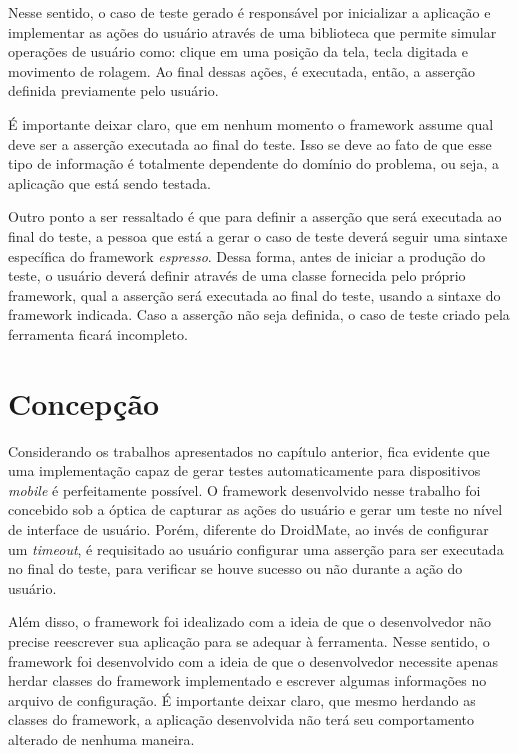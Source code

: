 \documentclass[
    12pt,       %
    openright,      %
    twoside,      %
    a4paper,      %
    english,      %
    french,       %
    spanish,      %
    brazil,       %
    ]{abntex2}
\begin{document}
        Nesse sentido, o caso de teste gerado é responsável por inicializar a aplicação e implementar as
        ações do usuário através de uma biblioteca que permite simular operações de usuário como: clique
        em uma posição da tela, tecla digitada e movimento de rolagem. Ao final dessas ações, é executada,
        então, a asserção definida previamente pelo usuário.

        É importante deixar claro, que em nenhum momento o framework assume qual deve ser a asserção
        executada ao final do teste. Isso se deve ao fato de que esse tipo de informação é totalmente
        dependente do domínio do problema, ou seja, a aplicação que está sendo testada.

        Outro ponto a ser ressaltado é que para definir a asserção que será executada ao final do teste,
        a pessoa que está a gerar o caso de teste deverá seguir uma sintaxe específica do framework
        \textit{espresso}. Dessa forma, antes de iniciar a produção do teste, o usuário
        deverá definir através de uma classe fornecida pelo próprio framework, qual a asserção será
        executada ao final do teste, usando a sintaxe do framework indicada. Caso a asserção não seja
        definida, o caso de teste criado pela ferramenta ficará incompleto.

      \section{Concepção}
        Considerando os trabalhos apresentados no capítulo anterior, fica evidente que uma implementação
        capaz de gerar testes automaticamente para dispositivos \textit{mobile} é perfeitamente possível. O
        framework desenvolvido nesse trabalho foi concebido sob a óptica de capturar as ações do
        usuário e gerar um teste no nível de interface de usuário. Porém, diferente do DroidMate, ao invés
        de configurar um \textit{timeout}, é requisitado ao usuário configurar uma asserção
        para ser executada no final do teste, para verificar se houve sucesso ou não durante a ação
        do usuário.

        Além disso, o framework foi idealizado com a ideia de que o desenvolvedor não precise
        reescrever sua aplicação para se adequar à ferramenta. Nesse sentido, o framework
        foi desenvolvido com a ideia de que o desenvolvedor necessite apenas herdar classes
        do framework implementado e escrever algumas informações no arquivo de configuração.
        É importante deixar claro, que mesmo herdando as classes do framework, a aplicação
        desenvolvida não terá seu comportamento alterado de nenhuma maneira.
\end{document}
